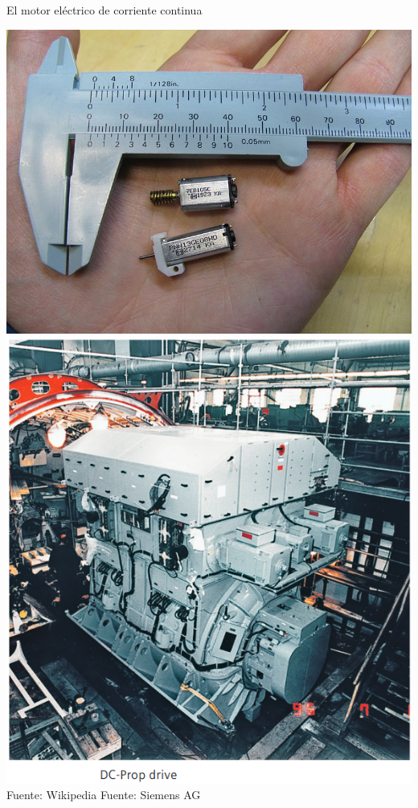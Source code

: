 \documentclass[presentation,aspectratio=169]{beamer}
\begin{document}
\begin{frame}[label={sec:org0b45881}]{El motor eléctrico de corriente continua}
\begin{center}
\includegraphics[height=0.6\textheight]{../../figures/wiki-small-dc-motor.jpg}
\includegraphics[width=0.6\textheight]{../../figures/Siemens-DC-prop.png}\\
{\footnotesize Fuente: Wikipedia \hspace*{3cm} Fuente: Siemens AG}
\end{center}
\end{frame}
\end{document}
